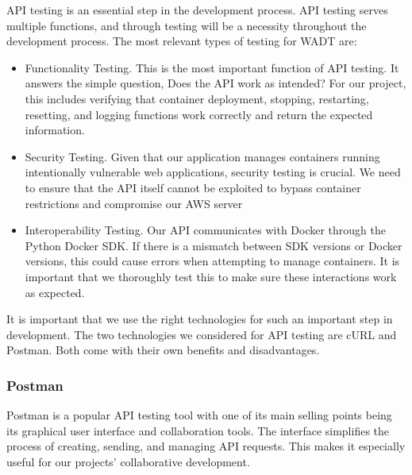 \documentclass[12pt]{article}
\begin{document}
API testing is an essential step in the development process. API testing serves multiple functions, and through testing will be a necessity throughout the development process. The most relevant types of testing for WADT are:
\begin{itemize}
\item Functionality Testing. This is the most important function of API testing. It answers the simple question, Does the API work as intended? For our project, this includes verifying that container deployment, stopping, restarting, resetting, and logging functions work correctly and return the expected information. 
\item Security Testing. Given that our application manages containers running intentionally vulnerable web applications, security testing is crucial. We need to ensure that the API itself cannot be exploited to bypass container restrictions and compromise our AWS server
\item Interoperability Testing. Our API communicates with Docker through the Python Docker SDK. If there is a mismatch between SDK versions or Docker versions, this could cause errors when attempting to manage containers. It is important that we thoroughly test this to make sure these interactions work as expected.
\end{itemize}

It is important that we use the right technologies for such an important step in development. The two technologies we considered for API testing are cURL and Postman. Both come with their own benefits and disadvantages.

\subsubsection{Postman}
Postman is a popular API testing tool with one of its main selling points being its graphical user interface and collaboration tools. The interface simplifies the process of creating, sending, and managing API requests. This makes it especially useful for our projects’ collaborative development.
\end{document}
